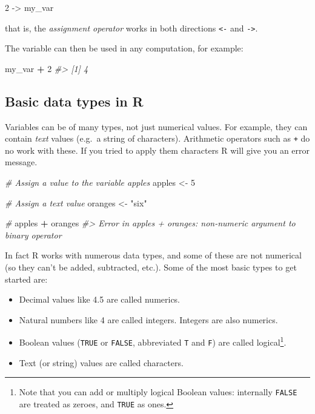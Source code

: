 \documentclass[
]{book}
\newenvironment{Shaded}{\begin{snugshade}}{\end{snugshade}}
\newcommand{\CommentTok}[1]{\textcolor[rgb]{0.56,0.35,0.01}{\textit{#1}}}
\newcommand{\DecValTok}[1]{\textcolor[rgb]{0.00,0.00,0.81}{#1}}
\newcommand{\NormalTok}[1]{#1}
\newcommand{\OtherTok}[1]{\textcolor[rgb]{0.56,0.35,0.01}{#1}}
\newcommand{\SpecialCharTok}[1]{\textcolor[rgb]{0.81,0.36,0.00}{\textbf{#1}}}
\newcommand{\StringTok}[1]{\textcolor[rgb]{0.31,0.60,0.02}{#1}}
\providecommand{\tightlist}{%
  \setlength{\itemsep}{0pt}\setlength{\parskip}{0pt}}
\begin{document}
\begin{Shaded}
\begin{Highlighting}[]
\DecValTok{2} \OtherTok{{-}\textgreater{}}\NormalTok{ my\_var}
\end{Highlighting}
\end{Shaded}

that is, the \emph{assignment operator} works in both directions \texttt{\textless{}-} and \texttt{-\textgreater{}}.

The variable can then be used in any computation, for example:

\begin{Shaded}
\begin{Highlighting}[]
\NormalTok{my\_var }\SpecialCharTok{+} \DecValTok{2} 
\CommentTok{\#\textgreater{} [1] 4}
\end{Highlighting}
\end{Shaded}

\subsection{Basic data types in R}\label{basic-data-types-in-r}

Variables can be of many types, not just numerical values. For example, they can contain \emph{text} values (e.g.~a string of characters). Arithmetic operators such as \texttt{+} do no work with these. If you tried to apply them characters R will give you an error message.

\begin{Shaded}
\begin{Highlighting}[]
\CommentTok{\# Assign a value to the variable apples}
\NormalTok{apples }\OtherTok{\textless{}{-}} \DecValTok{5} 

\CommentTok{\# Assign a text value}
\NormalTok{oranges }\OtherTok{\textless{}{-}} \StringTok{"six"} 

\CommentTok{\#  }
\NormalTok{apples }\SpecialCharTok{+}\NormalTok{ oranges }
\CommentTok{\#\textgreater{} Error in apples + oranges: non{-}numeric argument to binary operator}
\end{Highlighting}
\end{Shaded}

In fact R works with numerous data types, and some of these are not numerical (so they can't be added, subtracted, etc.). Some of the most basic types to get started are:

\begin{itemize}
\tightlist
\item
  Decimal values like 4.5 are called numerics.
\item
  Natural numbers like 4 are called integers. Integers are also numerics.
\item
  Boolean values (\texttt{TRUE} or \texttt{FALSE}, abbreviated \texttt{T} and \texttt{F}) are called logical\footnote{Note that you can add or multiply logical Boolean values: internally \texttt{FALSE} are treated as zeroes, and \texttt{TRUE} as ones.}.
\item
  Text (or string) values are called characters.
\end{itemize}
\end{document}
